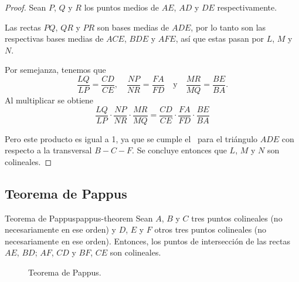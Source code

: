 \begin{proof}
    Sean $P$, $Q$ y $R$ los puntos medios de $AE$, $AD$ y $DE$ respectivamente.

    \begin{multicols}{2}

        \begin{figure}[H]
            \centering
            
        \end{figure}

        Las rectas $PQ$, $QR$ y $PR$ son bases medias de $ADE$, por lo tanto son las respectivas bases medias de $ACE$, $BDE$ y $AFE$, así que estas pasan por $L$, $M$ y $N$.

        Por semejanza, tenemos que
        \[
            \frac{LQ}{LP} = \frac{CD}{CE},\quad \frac{NP}{NR} = \frac{FA}{FD}\quad \text{y} \quad \frac{MR}{MQ} = \frac{BE}{BA}.
        \]
        Al multiplicar se obtiene
        \[
            \frac{LQ}{LP} \cdot \frac{NP}{NR} \cdot \frac{MR}{MQ} = \frac{CD}{CE} \cdot \frac{FA}{FD} \cdot \frac{BE}{BA}
        \]
    \end{multicols}

    Pero este producto es igual a 1, ya que se cumple el~ para el triángulo $ADE$ con respecto a la transversal $B-C-F$.
    Se concluye entonces que $L$, $M$ y $N$ son colineales.
\end{proof}




\subsection{Teorema de Pappus}

\begin{section-theorem.tcb}{Teorema de Pappus}{pappus-theorem}
    Sean $A$, $B$ y $C$ tres puntos colineales (no necesariamente en ese orden) y $D$, $E$ y $F$ otros tres puntos colineales (no necesariamente en ese orden).
    Entonces, los puntos de intersección de las rectas $AE$, $BD$; $AF$, $CD$ y $BF$, $CE$ son colineales.
\end{section-theorem.tcb}

\begin{figure}[H]
    \centering
    
    \caption{Teorema de Pappus.}
    \label{fig:pappus-theorem}
\end{figure}

